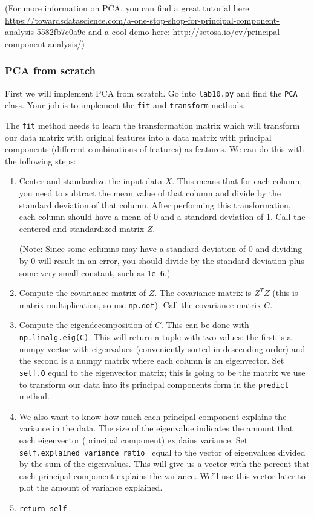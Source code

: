 \documentclass{article}
\begin{document}
(For more information on PCA, you can find a great tutorial here: \url{https://towardsdatascience.com/a-one-stop-shop-for-principal-component-analysis-5582fb7e0a9c} and a cool demo here: \url{http://setosa.io/ev/principal-component-analysis/})

\subsubsection{PCA from scratch}

First we will implement PCA from scratch. Go into \texttt{lab10.py} and find the \texttt{PCA} class. Your job is to implement the \texttt{fit} and \texttt{transform} methods.

The \texttt{fit} method needs to learn the transformation matrix which will transform our data matrix with original features into a data matrix with principal components (different combinations of features) as features. We can do this with the following steps:

\begin{enumerate}
    \item Center and standardize the input data $X$. This means that for each column, you need to subtract the mean value of that column and divide by the standard deviation of that column. After performing this transformation, each column should have a mean of 0 and a standard deviation of 1. Call the centered and standardized matrix $Z$.
    
    (Note: Since some columns may have a standard deviation of 0 and dividing by 0 will result in an error, you should divide by the standard deviation plus some very small constant, such as \texttt{1e-6}.)
    
    \item Compute the covariance matrix of $Z$. The covariance matrix is $Z^T Z$ (this is matrix multiplication, so use \texttt{np.dot}). Call the covariance matrix $C$.
    
    \item Compute the eigendecomposition of $C$. This can be done with \texttt{np.linalg.eig(C)}. This will return a tuple with two values: the first is a numpy vector with eigenvalues (conveniently sorted in descending order) and the second is a numpy matrix where each column is an eigenvector. Set \texttt{self.Q} equal to the eigenvector matrix; this is going to be the matrix we use to transform our data into its principal components form in the \texttt{predict} method.
    
    \item We also want to know how much each principal component explains the variance in the data. The size of the eigenvalue indicates the amount that each eigenvector (principal component) explains variance. Set \texttt{self.explained\_variance\_ratio\_} equal to the vector of eigenvalues divided by the sum of the eigenvalues. This will give us a vector with the percent that each principal component explains the variance. We'll use this vector later to plot the amount of variance explained.
    
    \item \texttt{return self}
\end{enumerate}
\end{document}
